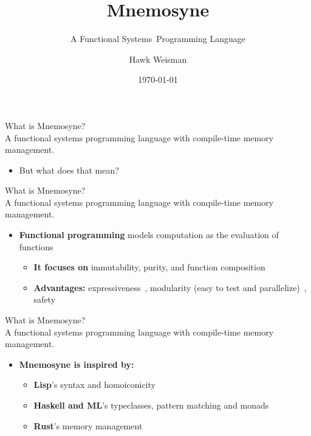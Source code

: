 \documentclass{beamer}
\title{\huge Mnemosyne}
\subtitle{A Functional Systems~Programming Language}
\author[Hawk Weisman]{Hawk Weisman}
\institute[Allegheny College]{Department of Computer Science \\ Allegheny College}
\date{\today}
\begin{document}
\maketitle

\begin{frame}
\huge What is Mnemosyne? \normalsize \\
A functional systems programming language with compile-time memory management.
\begin{itemize}
    \item But what does that mean?
\end{itemize}
\end{frame}

\begin{frame}
\huge What is Mnemosyne? \normalsize \\
A \alert<1->{functional} systems programming language with compile-time memory management.
\begin{itemize}
\item<2->
\textbf{Functional programming} models computation as the evaluation of functions~\cite{Wise:2003:FP:1074100.1074416,hughes1989functional}
\begin{itemize}
    \item<2-> \textbf{It focuses on} immutability, purity, and function composition
    \item<3> \textbf{Advantages:} expressiveness~\cite{hughes1989functional,hudak1994haskell}, modularity (easy to test and parallelize)~\cite{hughes1989functional,hudak1994haskell}, safety
    \end{itemize}

\end{itemize}
\end{frame}

\begin{frame}
\huge What is Mnemosyne? \normalsize \\
A \alert<1->{functional} systems programming language with compile-time memory management.
\begin{itemize}
\item
\textbf{Mnemosyne is inspired by:}
    \begin{itemize}
        \item\textbf{Lisp}'s syntax and homoiconicity
        \item\textbf{Haskell and ML}'s typeclasses, pattern matching and monads
        \item\textbf{Rust}'s memory management
    \end{itemize}

\end{itemize}
\end{frame}
\end{document}
